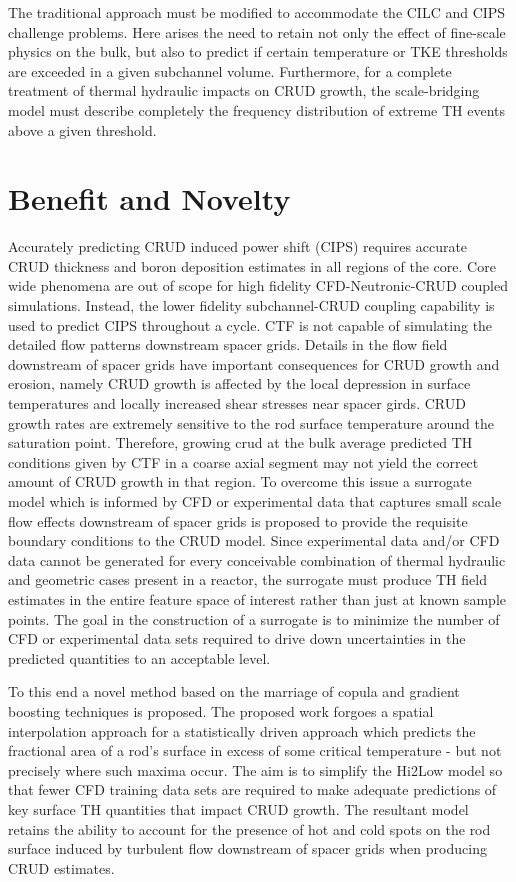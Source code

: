 The traditional approach must be modified to accommodate the CILC and CIPS
challenge problems.  Here arises the need to retain not only the effect of
fine-scale physics on the bulk, but also to predict if certain temperature or
TKE thresholds are exceeded in a given subchannel volume.  Furthermore, for a
complete treatment of thermal hydraulic impacts on CRUD growth, the
scale-bridging model must describe completely the frequency distribution of
extreme TH events above a given threshold.


\section{Benefit and Novelty}

Accurately predicting CRUD induced power shift (CIPS) requires accurate CRUD
thickness and boron deposition estimates in all regions of the core.  Core wide
phenomena are out of scope for high fidelity CFD-Neutronic-CRUD coupled
simulations.  Instead, the lower fidelity subchannel-CRUD coupling capability is used to
predict CIPS throughout a cycle.  CTF is not capable of simulating the detailed
flow patterns downstream spacer grids.  Details in the flow field
downstream of spacer grids have important consequences for CRUD growth and
erosion, namely CRUD growth is affected by the local depression in surface temperatures and locally
increased shear stresses near spacer girds.  CRUD growth rates are extremely sensitive to the rod surface
temperature around the saturation point.  Therefore, growing crud at the bulk
average predicted TH conditions given by CTF in a coarse axial segment may not
yield the correct amount of CRUD growth in that region.  To overcome this issue
a surrogate model which is informed by CFD or experimental data that captures
small scale flow effects downstream of spacer grids is proposed to provide the requisite
boundary conditions to the CRUD model.  Since experimental data and/or CFD data
cannot be generated for every conceivable combination of thermal hydraulic and
geometric cases present in a reactor, the surrogate must produce
TH field estimates in the entire feature space of interest rather than just at known
sample points.  The goal in the construction of a surrogate is to minimize the
number of CFD or experimental data sets required to drive down uncertainties in
the predicted quantities to an acceptable level.

To this end a novel method based on the marriage of copula and gradient
boosting techniques is proposed.  The proposed work forgoes a spatial
interpolation approach for a statistically driven approach which predicts the
fractional area of a rod's surface in excess of some critical temperature - but
not precisely where such maxima occur.  The aim is to simplify the Hi2Low model
so that fewer CFD training data sets are required to make adequate predictions
of key surface TH quantities that impact CRUD growth.  The resultant model
retains the ability to account for the presence of hot and cold spots on the rod surface induced by
turbulent flow downstream of spacer grids when producing CRUD estimates.

